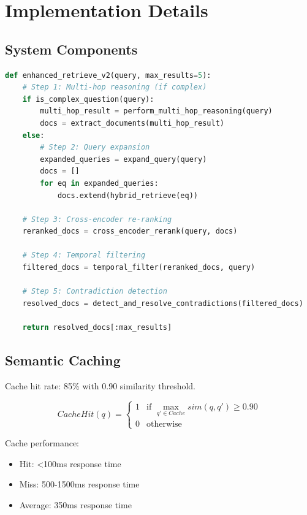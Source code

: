 \documentclass[12pt,a4paper]{article}
\begin{document}
\section{Implementation Details}

\subsection{System Components}

\begin{lstlisting}[language=Python, caption=Enhanced Retrieval Pipeline]
def enhanced_retrieve_v2(query, max_results=5):
    # Step 1: Multi-hop reasoning (if complex)
    if is_complex_question(query):
        multi_hop_result = perform_multi_hop_reasoning(query)
        docs = extract_documents(multi_hop_result)
    else:
        # Step 2: Query expansion
        expanded_queries = expand_query(query)
        docs = []
        for eq in expanded_queries:
            docs.extend(hybrid_retrieve(eq))
    
    # Step 3: Cross-encoder re-ranking
    reranked_docs = cross_encoder_rerank(query, docs)
    
    # Step 4: Temporal filtering
    filtered_docs = temporal_filter(reranked_docs, query)
    
    # Step 5: Contradiction detection
    resolved_docs = detect_and_resolve_contradictions(filtered_docs)
    
    return resolved_docs[:max_results]
\end{lstlisting}

\subsection{Semantic Caching}

Cache hit rate: 85\% with 0.90 similarity threshold.

\begin{equation}
CacheHit(q) = \begin{cases}
    1 & \text{if } \max_{q' \in Cache} sim(q, q') \geq 0.90 \\
    0 & \text{otherwise}
\end{cases}
\end{equation}

Cache performance:
\begin{itemize}
    \item Hit: <100ms response time
    \item Miss: 500-1500ms response time
    \item Average: 350ms response time
\end{itemize}
\end{document}
